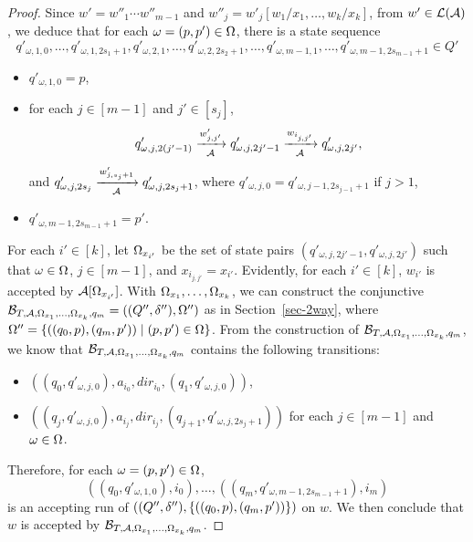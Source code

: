 \begin{proof}
Since $ w' = w''_1 \cdots w''_{m-1}$ and $w''_j = w'_j[w_1/x_1,\ldots, w_k/x_k]$, 
from $w' \in \mathcal{L}(\mathcal{A})$, we deduce that for each $\omega = (p, p') \in \Omega$, there is a state sequence 
%
{\small
$$q'_{\omega, 1, 0}, \ldots, q'_{\omega, 1, 2s_1+1}, q'_{\omega, 2, 1}, \ldots, q'_{\omega, 2, 2s_2+1}, \ldots, q'_{\omega, m-1, 1}, \ldots, q'_{\omega, m-1, 2s_{m-1}+1} \in Q'$$ 
}
%
\begin{itemize}
\item $q'_{\omega,1, 0}= p$, 
%
\item for each $j \in [m-1]$ and $j' \in [s_j]$, 
$$q'_{\omega, j, 2(j'-1)} \xrightarrow[\mathcal{A}]{w'_{j, j'}} q'_{\omega, j, 2j'-1} \xrightarrow[\mathcal{A}]{w_{i_{j, j'}}} q'_{\omega, j, 2j'},$$ 
%
and $q'_{\omega, j, 2s_j} \xrightarrow[\mathcal{A}]{w'_{j, s_j+1}} q'_{\omega, j, 2s_j+1}$,  where $q'_{\omega, j, 0} = q'_{\omega, j-1, 2s_{j-1}+1}$ if $j > 1$, 
%
\item $q'_{\omega, m-1, 2s_{m-1}+1} = p'$.
\end{itemize}
For each $i' \in [k]$, let $\Omega_{x_{i'}}$ be the set of state pairs $(q'_{\omega, j, 2j'-1}, q'_{\omega, j, 2j'})$ such that $\omega \in \Omega$, $j \in [m-1]$, and $x_{i_{j, j'}} = x_{i'}$. Evidently, for each $i' \in [k]$, $w_{i'}$ is accepted by $\mathcal{A}[\Omega_{x_{i'}}]$.
With $\Omega_{x_1}, \ldots, \Omega_{x_k}$, we can construct the conjunctive \SSA{} $\mathcal{B}_{T, \mathcal{A}, \Omega_{x_1}, \ldots, \Omega_{x_k}, q_m} = ((Q'', \delta''), \Omega'')$ as in Section~\ref{sec-2way}, where $\Omega'' = \{((q_0, p), (q_m, p') ) \mid (p, p') \in \Omega\}$. From the construction of $\mathcal{B}_{T, \mathcal{A}, \Omega_{x_1}, \ldots, \Omega_{x_k}, q_m}$, we know that $\mathcal{B}_{T, \mathcal{A}, \Omega_{x_1}, \ldots, \Omega_{x_k}, q_m}$ contains the following transitions: 
\begin{itemize}
\item $((q_0, q'_{\omega, j, 0}), a_{i_0}, dir_{i_0}, (q_1, q'_{\omega, j, 0}))$,
%  
\item $((q_j, q'_{\omega, j, 0}), a_{i_j}, dir_{i_j}, (q_{j+1}, q'_{\omega, j, 2s_{j}+1}))$ for each $j \in [m-1]$ and $\omega \in \Omega$.
\end{itemize}
Therefore, for each $\omega = (p, p') \in \Omega$, 
$$((q_0, q'_{\omega, 1, 0}), i_0), \ldots, ((q_m, q'_{\omega, m-1, 2s_{m-1}+1}), i_m)$$ 
is an accepting run of $((Q'', \delta''), \{((q_0, p), (q_m, p'))\})$ on $w$. 
We then conclude that $w$ is accepted by $\mathcal{B}_{T, \mathcal{A}, \Omega_{x_1}, \ldots, \Omega_{x_k}, q_m}$.


\end{proof}
